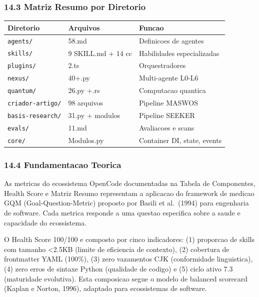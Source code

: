 \documentclass[
  12pt,
]{article}
\newcounter{none} %
\begin{document}
\subsubsection{14.3 Matriz Resumo por
Diretorio}\label{matriz-resumo-por-diretorio}

{\def\LTcaptype{none} %
\begin{longtable}[]{@{}lll@{}}
\toprule\noalign{}
Diretorio & Arquivos & Funcao \\
\midrule\noalign{}
\endhead
\bottomrule\noalign{}
\endlastfoot
\texttt{agents/} & 58.md & Definicoes de agentes \\
\texttt{skills/} & 9 SKILL.md + 14 cc & Habilidades especializadas \\
\texttt{plugins/} & 2.ts & Orquestradores \\
\texttt{nexus/} & 40+.py & Multi-agente L0-L6 \\
\texttt{quantum/} & 26.py +.rs & Computacao quantica \\
\texttt{criador-artigo/} & 98 arquivos & Pipeline MASWOS \\
\texttt{basis-research/} & 31.py + modulos & Pipeline SEEKER \\
\texttt{evals/} & 11.md & Avaliacoes e scans \\
\texttt{core/} & Modulos.py & Container DI, state, events \\
\end{longtable}
}

\subsubsection{14.4 Fundamentacao
Teorica}\label{fundamentacao-teorica-13}

As metricas do ecossistema OpenCode documentadas na Tabela de
Componentes, Health Score e Matriz Resumo representam a aplicacao do
framework de medicao GQM (Goal-Question-Metric) proposto por Basili et
al.~(1994) para engenharia de software. Cada metrica responde a uma
questao especifica sobre a saude e capacidade do ecossistema.

O Health Score 100/100 e composto por cinco indicadores: (1) proporcao
de skills com tamanho \textless2.5KB (limite de eficiencia de contexto),
(2) cobertura de frontmatter YAML (100\%), (3) zero vazamentos CJK
(conformidade linguistica), (4) zero erros de sintaxe Python (qualidade
de codigo) e (5) ciclo ativo 7.3 (maturidade evolutiva). Esta composicao
segue o modelo de balanced scorecard (Kaplan e Norton, 1996), adaptado
para ecossistemas de software.
\end{document}
